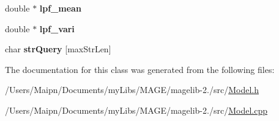 \begin{DoxyCompactItemize}
\item 
\hypertarget{class_m_a_g_e_1_1_model_memory_ab97ed8bed09fa61ab56e88380879f9f9}{double $\ast$ {\bfseries lpf\-\_\-mean}}\label{class_m_a_g_e_1_1_model_memory_ab97ed8bed09fa61ab56e88380879f9f9}

\item 
\hypertarget{class_m_a_g_e_1_1_model_memory_a7e047e702ee5029a374fd76c7924346e}{double $\ast$ {\bfseries lpf\-\_\-vari}}\label{class_m_a_g_e_1_1_model_memory_a7e047e702ee5029a374fd76c7924346e}

\item 
\hypertarget{class_m_a_g_e_1_1_model_memory_a73e749ceae42aff89c1865122956fcc4}{char {\bfseries str\-Query} \mbox{[}max\-Str\-Len\mbox{]}}\label{class_m_a_g_e_1_1_model_memory_a73e749ceae42aff89c1865122956fcc4}

\end{DoxyCompactItemize}


The documentation for this class was generated from the following files\-:\begin{DoxyCompactItemize}
\item 
/\-Users/\-Maipn/\-Documents/my\-Libs/\-M\-A\-G\-E/magelib-\/2./src/\hyperlink{_model_8h}{Model.\-h}\item 
/\-Users/\-Maipn/\-Documents/my\-Libs/\-M\-A\-G\-E/magelib-\/2./src/\hyperlink{_model_8cpp}{Model.\-cpp}\end{DoxyCompactItemize}
